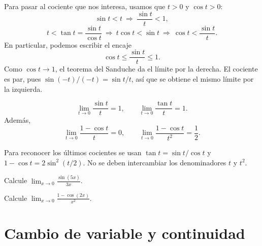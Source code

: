 \documentclass[10pt,a5paper]{article}
\newif\ifmostrarSoluciones
\begin{document}
Para pasar al cociente que nos interesa, usamos que $t>0$ y $\cos t>0$:
\[
  \sin t<t\ \Longrightarrow\ \frac{\sin t}{t}<1,
\]
\[
  t<\tan t=\frac{\sin t}{\cos t}
  \ \Longrightarrow\ t\cos t<\sin t
  \ \Longrightarrow\ \cos t<\frac{\sin t}{t}.
\]
En particular, podemos escribir el encaje
\[
  \cos t\leq\frac{\sin t}{t}\leq1.
\]
Como $\cos t\to1$, el teorema del Sanduche da el límite por la derecha. El cociente es par, pues $\sin(-t)/(-t)=\sin t/t$, así que se obtiene el mismo límite por la izquierda.

\begin{teorema}
\[
  \boxed{\lim_{t\to0}\frac{\sin t}{t}=1},\qquad
  \lim_{t\to0}\frac{\tan t}{t}=1.
\]
Además,
\[
  \lim_{t\to0}\frac{1-\cos t}{t}=0,\qquad
  \lim_{t\to0}\frac{1-\cos t}{t^2}=\frac12.
\]
\end{teorema}

Para reconocer los últimos cocientes se usan $\tan t=\sin t/\cos t$ y $1-\cos t=2\sin^2(t/2)$. No se deben intercambiar los denominadores $t$ y $t^2$.

\begin{ejemplo}
Calcule $\displaystyle\lim_{x\to0}\frac{\sin(5x)}{3x}$.
\end{ejemplo}
\ifmostrarSoluciones
\begin{solucion}
Escribimos
\[
  \frac{\sin(5x)}{3x}=\frac53\frac{\sin(5x)}{5x}.
\]
Con $t=5x$, se tiene $t\to0$ y $t\neq0$ si $x\neq0$. El cociente fundamental tiende a $1$, por lo que el límite es $5/3$.
\end{solucion}
\else\vspace{18mm}\fi

\begin{ejemplo}
Calcule $\displaystyle\lim_{x\to0}\frac{1-\cos(2x)}{x^2}$.
\end{ejemplo}
\ifmostrarSoluciones
\begin{solucion}
La identidad $1-\cos(2x)=2\sin^2x$ da
\[
  \frac{1-\cos(2x)}{x^2}=2\left(\frac{\sin x}{x}\right)^2\longrightarrow2.
\]
El denominador es cuadrático; usar el límite con denominador lineal daría una conclusión incorrecta.
\end{solucion}
\else\vspace{16mm}\fi

\section*{Cambio de variable y continuidad}
\end{document}
